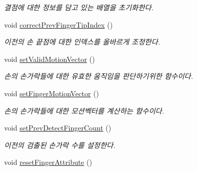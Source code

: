 \begin{DoxyCompactItemize}
\begin{DoxyCompactList}\small\item\em 결점에 대한 정보를 담고 있는 배열을 초기화한다. \end{DoxyCompactList}\item 
\hypertarget{class_fk_hand_afb12349cd56f5d1dd55ba51beb587437}{}void \hyperlink{class_fk_hand_afb12349cd56f5d1dd55ba51beb587437}{correct\+Prev\+Finger\+Tip\+Index} ()\label{class_fk_hand_afb12349cd56f5d1dd55ba51beb587437}

\begin{DoxyCompactList}\small\item\em 이전의 손 끝점에 대한 인덱스를 올바르게 조정한다. \end{DoxyCompactList}\item 
\hypertarget{class_fk_hand_a25bb7189f946d6c12be310a7ca500133}{}void \hyperlink{class_fk_hand_a25bb7189f946d6c12be310a7ca500133}{set\+Valid\+Motion\+Vector} ()\label{class_fk_hand_a25bb7189f946d6c12be310a7ca500133}

\begin{DoxyCompactList}\small\item\em 손의 손가락들에 대한 유효한 움직임을 판단하기위한 함수이다. \end{DoxyCompactList}\item 
\hypertarget{class_fk_hand_a763f90cb7f1b273e94fce94ae204e2c7}{}void \hyperlink{class_fk_hand_a763f90cb7f1b273e94fce94ae204e2c7}{set\+Finger\+Motion\+Vector} ()\label{class_fk_hand_a763f90cb7f1b273e94fce94ae204e2c7}

\begin{DoxyCompactList}\small\item\em 손의 손가락들에 대한 모션벡터를 계산하는 함수이다. \end{DoxyCompactList}\item 
\hypertarget{class_fk_hand_a3b2cb0fe1b1bb5b760566b881dbb5b8a}{}void \hyperlink{class_fk_hand_a3b2cb0fe1b1bb5b760566b881dbb5b8a}{set\+Prev\+Detect\+Finger\+Count} ()\label{class_fk_hand_a3b2cb0fe1b1bb5b760566b881dbb5b8a}

\begin{DoxyCompactList}\small\item\em 이전의 검출된 손가락 수를 설정한다. \end{DoxyCompactList}\item 
\hypertarget{class_fk_hand_a35d8299f0fca777c777655c7050eb1c1}{}void \hyperlink{class_fk_hand_a35d8299f0fca777c777655c7050eb1c1}{reset\+Finger\+Attribute} ()\label{class_fk_hand_a35d8299f0fca777c777655c7050eb1c1}


\end{DoxyCompactItemize}
